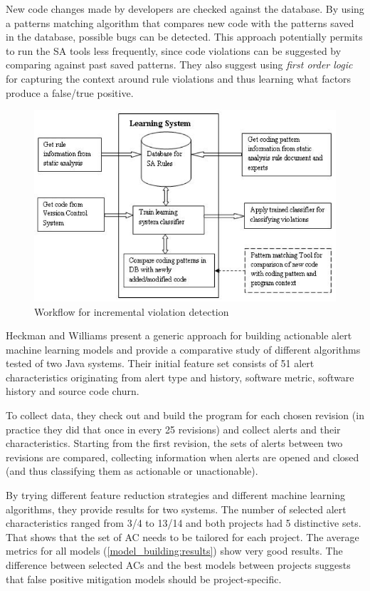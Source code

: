  New code changes made by developers are checked against the database. By using a patterns matching algorithm that compares new code with the patterns saved in the database, possible bugs can be detected. This approach potentially permits to run the SA tools less frequently, since code violations can be suggested by comparing against past saved patterns. They also suggest using \textit{first order logic} for capturing the context around rule violations and thus learning what factors produce a false/true positive.

 \begin{figure}[H]
     \centering
     \includegraphics[scale=0.3]{./src/incremental_sa_workflow.png}
     \caption{Workflow for incremental violation detection}\label{incremental_sa:workflow}
 \end{figure}


 Heckman and Williams \cite{model_building_actionable} present a generic approach for building actionable alert machine learning models and provide a comparative study of different algorithms tested of two Java systems. Their initial feature set consists of 51 alert characteristics originating from alert type and history, software metric, software history and source code churn.

 To collect data, they check out and build the program for each chosen revision (in practice they did that once in every 25 revisions) and collect alerts and their characteristics. Starting from the first revision, the sets of alerts between two revisions are compared, collecting information when alerts are opened and closed (and thus classifying them as actionable or unactionable).

 By trying different feature reduction strategies and different machine learning algorithms, they provide results for two systems. The number of selected alert characteristics ranged from 3/4 to 13/14 and both projects had 5 distinctive sets. That shows that the set of AC needs to be tailored for each project. The average metrics for all models (\cref{model_building:results}) show very good results. The difference between selected ACs and
 the best models between projects suggests that false positive mitigation models should be project-specific.

